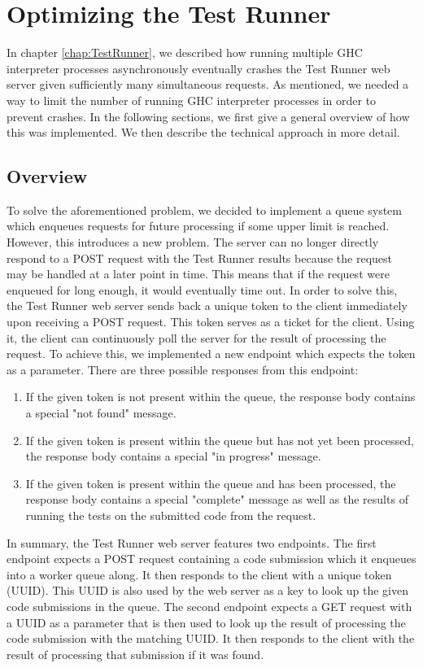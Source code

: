 \chapter{Optimizing the Test Runner} \label{chap:OptimizingTestRunner}
In chapter \ref{chap:TestRunner}, we described how running multiple GHC interpreter processes asynchronously eventually crashes the Test Runner web server given sufficiently many simultaneous requests.
As mentioned, we needed a way to limit the number of running GHC interpreter processes in order to prevent crashes.
In the following sections, we first give a general overview of how this was implemented.
We then describe the technical approach in more detail.

\section{Overview}
To solve the aforementioned problem, we decided to implement a queue system which enqueues requests for future processing if some upper limit is reached.
However, this introduces a new problem.
The server can no longer directly respond to a POST request with the Test Runner results because the request may be handled at a later point in time.
This means that if the request were enqueued for long enough, it would eventually time out.
In order to solve this, the Test Runner web server sends back a unique token to the client immediately upon receiving a POST request.
This token serves as a ticket for the client.
Using it, the client can continuously poll the server for the result of processing the request.
To achieve this, we implemented a new endpoint which expects the token as a parameter.
There are three possible responses from this endpoint:
\begin{enumerate}
    \item If the given token is not present within the queue, the response body contains a special "not found" message.
    \item If the given token is present within the queue but has not yet been processed, the response body contains a special "in progress" message.
    \item If the given token is present within the queue and has been processed, the response body contains a special "complete" message as well as the results of running the tests on the submitted code from the request.
\end{enumerate}

In summary, the Test Runner web server features two endpoints.
The first endpoint expects a POST request containing a code submission which it enqueues into a worker queue along.
It then responds to the client with a unique token (UUID).
This UUID is also used by the web server as a key to look up the given code submissions in the queue.
The second endpoint expects a GET request with a UUID as a parameter that is then used to look up the result of processing the code submission with the matching UUID.
It then responds to the client with the result of processing that submission if it was found.


